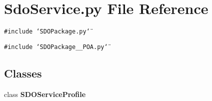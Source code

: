 \section{Sdo\-Service.py File Reference}
\label{SdoService_8py}
{\tt \#include \char`\"{}SDOPackage.py\char`\"{}}\par
{\tt \#include \char`\"{}SDOPackage\_\-\_\-POA.py\char`\"{}}\par
\subsection*{Classes}
\begin{CompactItemize}
\item 
class {\bf SDOService\-Profile}
\end{CompactItemize}
